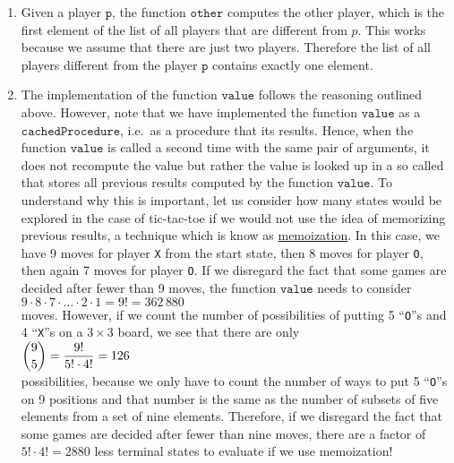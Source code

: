 \begin{enumerate}
\item Given a player $\texttt{p}$, the function $\texttt{other}$ computes the other player,
      which is the first element of the list of all players that are different from $p$.
      This works because we assume that there are just two players.  Therefore the list of all players
      different from the player $\texttt{p}$ contains exactly one element.
\item The implementation of the function $\texttt{value}$ follows the reasoning outlined above.
      However, note that we have implemented the function $\texttt{value}$ as a $\texttt{cachedProcedure}$, i.e.~as a
      procedure that  its results.  Hence, when the function $\texttt{value}$ is called a
      second time with the same pair of arguments, it does not recompute the value but rather the value is
      looked up in a so called  that stores all previous results computed by the function $\texttt{value}$.  To
      understand why this is important, 
      let us consider how many states would be explored in the case of tic-tac-toe if we would not use the idea
      of memorizing previous results, a technique which is know as 
      \href{https://en.wikipedia.org/wiki/Memoization}{memoization}.  In this case, we have 9 moves for player
      \texttt{X} from the start state, then 8 moves for player \texttt{O}, then again 7 moves for
      player \texttt{O}.  If we disregard the fact that some games are decided after fewer than 9 moves,
      the function $\texttt{value}$ needs to consider 
      \\[0.2cm]
      \hspace*{1.3cm}
      $9 \cdot 8 \cdot 7 \cdot {\dots} \cdot 2 \cdot 1 = 9! = 362\,880$
      \\[0.2cm]
      moves.  However, if we count the number of possibilities of putting 5 ``\texttt{O}''s and 4
      ``\texttt{X}''s on a $3 \times 3$ board, we see that there are only
      \\[0.2cm]
      \hspace*{1.3cm}
      $\displaystyle {9 \choose 5} = \frac{9!}{5! \cdot 4!} = 126$
      \\[0.2cm]
      possibilities, because we only have to count the number of ways to put 5 ``\texttt{O}''s on
      9 positions and that number is the same as the number of subsets of five elements from a set of nine elements.
      Therefore, if we disregard the fact that some games are decided after fewer than nine moves,  there are a
      factor of $5! \cdot 4! = 2880$ less terminal states to evaluate if we use memoization!


\end{enumerate}
